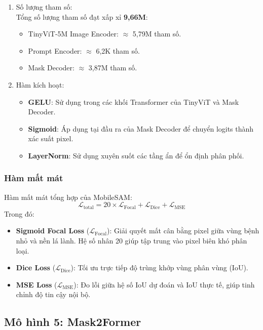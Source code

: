\begin{enumerate}
    \item Số lượng tham số:\\
          Tổng số lượng tham số đạt xấp xỉ \textbf{9,66M}:
          \begin{itemize}
              \item TinyViT-5M Image Encoder: $\approx$ 5,79M tham số.
              \item Prompt Encoder: $\approx$ 6,2K tham số.
              \item Mask Decoder: $\approx$ 3,87M tham số.
          \end{itemize}

    \item Hàm kích hoạt:
          \begin{itemize}
              \item \textbf{GELU}: Sử dụng trong các khối Transformer của TinyViT và Mask Decoder.
              \item \textbf{Sigmoid}: Áp dụng tại đầu ra của Mask Decoder để chuyển logits thành xác suất pixel.
              \item \textbf{LayerNorm}: Sử dụng xuyên suốt các tầng ẩn để ổn định phân phối.
          \end{itemize}
\end{enumerate}

\subsubsection{Hàm mất mát}
Hàm mất mát tổng hợp của MobileSAM:
\begin{equation}
    \mathcal{L}_{\text{total}} = 20 \times \mathcal{L}_{\text{Focal}} + \mathcal{L}_{\text{Dice}} + \mathcal{L}_{\text{MSE}}
\end{equation}
Trong đó:
\begin{itemize}
    \item \textbf{Sigmoid Focal Loss} ($\mathcal{L}_{\text{Focal}}$): Giải quyết mất cân bằng pixel giữa vùng bệnh nhỏ và nền lá lành. Hệ số nhân 20 giúp tập trung vào pixel biên khó phân loại.
    \item \textbf{Dice Loss} ($\mathcal{L}_{\text{Dice}}$): Tối ưu trực tiếp độ trùng khớp vùng phân vùng (IoU).
    \item \textbf{MSE Loss} ($\mathcal{L}_{\text{MSE}}$): Đo lỗi giữa hệ số IoU dự đoán và IoU thực tế, giúp tinh chỉnh độ tin cậy nội bộ.
\end{itemize}

\subsection{Mô hình 5: Mask2Former}
\label{subsec:mask2former}

